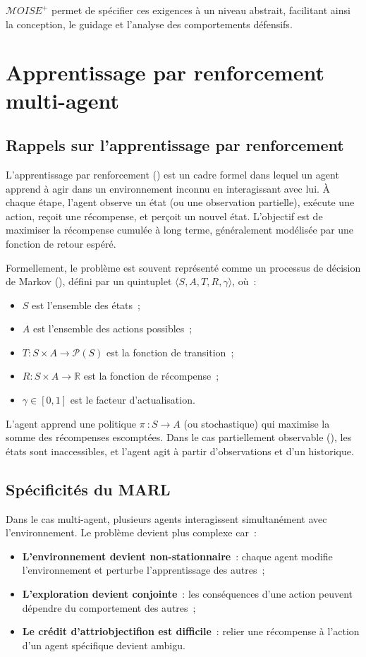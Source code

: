 $\mathcal{M}OISE^+$ permet de spécifier ces exigences à un niveau abstrait, facilitant ainsi la conception, le guidage et l'analyse des comportements défensifs.

\section{Apprentissage par renforcement multi-agent}

\subsection{Rappels sur l'apprentissage par renforcement}

L'apprentissage par renforcement () est un cadre formel dans lequel un agent apprend à agir dans un environnement inconnu en interagissant avec lui. À chaque étape, l'agent observe un état (ou une observation partielle), exécute une action, reçoit une récompense, et perçoit un nouvel état. L'objectif est de maximiser la récompense cumulée à long terme, généralement modélisée par une fonction de retour espéré.

Formellement, le problème est souvent représenté comme un processus de décision de Markov (), défini par un quintuplet $\langle S, A, T, R, \gamma \rangle$, où~:
\begin{itemize}
  \item $S$ est l'ensemble des états~;
  \item $A$ est l'ensemble des actions possibles~;
  \item $T: S \times A \rightarrow \mathcal{P}(S)$ est la fonction de transition~;
  \item $R: S \times A \rightarrow \mathbb{R}$ est la fonction de récompense~;
  \item $\gamma \in [0,1]$ est le facteur d'actualisation.
\end{itemize}

L'agent apprend une politique $\pi~: S \rightarrow A$ (ou stochastique) qui maximise la somme des récompenses escomptées. Dans le cas partiellement observable (), les états sont inaccessibles, et l'agent agit à partir d'observations et d'un historique.

\subsection{Spécificités du MARL}

Dans le cas multi-agent, plusieurs agents interagissent simultanément avec l'environnement. Le problème devient plus complexe car~:
\begin{itemize}
  \item \textbf{L'environnement devient non-stationnaire}~: chaque agent modifie l'environnement et perturbe l'apprentissage des autres~;
  \item \textbf{L'exploration devient conjointe}~: les conséquences d'une action peuvent dépendre du comportement des autres~;
  \item \textbf{Le crédit d'attriobjectifion est difficile}~: relier une récompense à l'action d'un agent spécifique devient ambigu.
\end{itemize}

